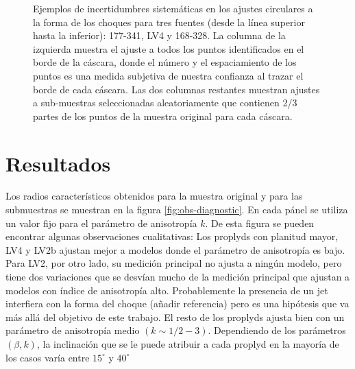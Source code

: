 \begin{figure}
\begin{tabular}{@{}c@{}c@{}c@{}}
\end{tabular}
\caption{Ejemplos de incertidumbres sistemáticas en los ajustes circulares a la forma de los choques para tres fuentes (desde la línea superior hasta la inferior): 177-341, LV4 y 168-328. La columna de la izquierda muestra el ajuste a todos los puntos identificados en el borde de la cáscara, donde el número y el espaciamiento de los puntos es una medida subjetiva de nuestra confianza al trazar el borde de cada cáscara. Las dos columnas restantes muestran ajustes a sub-muestras seleccionadas aleatoriamente que contienen 2/3 partes de los puntos de la muestra original para cada cáscara.}
\label{fig:char-radii-obs}
\end{figure}

\section{Resultados}

Los radios característicos obtenidos para la muestra original y para las submuestras se muestran en la figura \ref{fig:obs-diagnostic}. En cada pánel se utiliza un valor fijo para el parámetro de anisotropía $k$. De esta figura se pueden encontrar algunas observaciones cualitativas: Los proplyds con planitud mayor, LV4 y LV2b ajustan mejor a modelos donde el parámetro de anisotropía es bajo. Para LV2, por otro lado, su medición principal no ajusta a ningún modelo, pero tiene dos variaciones que se desvían mucho de la medición principal que ajustan a modelos con índice de anisotropía alto. Probablemente la presencia de un jet interfiera con la forma del choque (añadir referencia) pero es una hipótesis que va más allá del objetivo de este trabajo. El resto de los proplyds ajusta bien con un parámetro de anisotropía medio $(k\sim 1/2 - 3)$. Dependiendo de los parámetros $(\beta, k)$, la inclinación que se le puede atribuir a cada proplyd en la mayoría de los casos varía entre $15^\circ$ y $40^\circ$  

